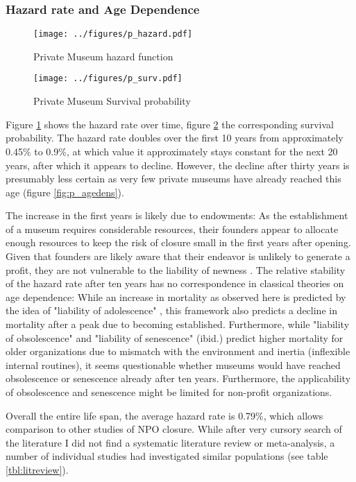 \documentclass[11pt]{article}
\begin{document}
\subsubsection*{Hazard rate and Age Dependence}


\begin{figure}[htbp]
\centering
\texttt{[image: ../figures/p\_hazard.pdf]}
\caption{\label{fig:p_hazard}Private Museum hazard function}
\end{figure}

\begin{figure}[htbp]
\centering
\texttt{[image: ../figures/p\_surv.pdf]}
\caption{\label{fig:p_surv}Private Museum Survival probability}
\end{figure}


Figure \ref{fig:p_hazard} shows the hazard rate over time, figure \ref{fig:p_surv} the corresponding survival probability.
The hazard rate doubles over the first 10 years from approximately 0.45\% to 0.9\%, at which value it approximately stays constant for the next 20 years, after which it appears to decline.
However, the decline after thirty years is presumably less certain as very few private museums have already reached this age (figure \ref{fig:p_agedens}).


The increase in the first years is likely due to endowments: As the establishment of a museum requires considerable resources, their founders appear to allocate enough resources to keep the risk of closure small in the first years after opening.
Given that founders are likely aware that their endeavor is unlikely to generate a profit, they are not vulnerable to the liability of newness \parencite{Stinchcombe_1965_structure}.
The relative stability of the hazard rate after ten years has no correspondence in classical theories on age dependence:
While an increase in mortality as observed here is predicted by the idea of "liability of adolescence" \parencite{Carroll_Khessina_2019_demography}, this framework also predicts a decline in mortality after a peak due to becoming established.
Furthermore, while "liability of obsolescence" and "liability of senescence" (ibid.) predict higher mortality for older organizations due to mismatch with the environment and inertia (inflexible internal routines), it seems questionable whether museums would have reached obsolescence or senescence already after ten years.
Furthermore, the applicability of obsolescence and senescence might be limited for non-profit organizations.


Overall the entire life span, the average hazard rate is 0.79\%, which allows comparison to other studies of NPO closure.
While after very cursory search of the literature I did not find a systematic literature review or meta-analysis, a number of individual studies had investigated similar populations (see table \ref{tbl:litreview}).
\end{document}
